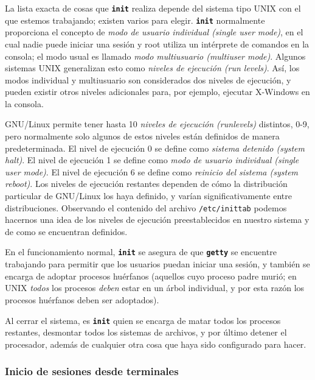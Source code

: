 \documentclass[12pt]{article}
\begin{document}
 La lista exacta de cosas que \texttt{\textbf{init}} realiza depende del sistema tipo UNIX
con el que estemos trabajando; existen varios para elegir. \texttt{\textbf{init}} normalmente
proporciona el concepto de \textit{modo de usuario individual (single user mode)}, en el cual nadie puede
iniciar una sesión y root utiliza un intérprete de comandos en la consola; el
modo usual es llamado \textit{modo multiusuario (multiuser mode)}.
Algunos sistemas UNIX generalizan esto
como \textit{niveles de ejecución (run levels)}. Así, los modos individual y
multiusuario son considerados dos niveles de ejecución, y pueden existir otros
niveles adicionales para, por ejemplo, ejecutar X-Windows en la consola.


 GNU/Linux permite tener hasta 10 \textit{niveles de ejecución (runlevels)} distintos, 0-9,
pero normalmente solo algunos de estos niveles están definidos de manera predeterminada. El
nivel de ejecución 0 se define como \textit{sistema detenido (system halt)}. El nivel
de ejecución 1 se define como \textit{modo de usuario individual (single user mode)}.
El nivel de ejecución 6 se define como \textit{reinicio del sistema (system reboot)}.
Los niveles de ejecución restantes dependen de cómo la distribución particular
de GNU/Linux los haya definido, y varían significativamente entre
distribuciones. Observando el contenido del archivo
\texttt{/etc/inittab} podemos hacernos una idea de los niveles de
ejecución preestablecidos en nuestro sistema y de como se encuentran definidos.


 En el funcionamiento normal, \texttt{\textbf{init}} se asegura de que
\texttt{\textbf{getty}} se encuentre trabajando para permitir que los usuarios puedan iniciar una
sesión, y también se encarga de adoptar procesos huérfanos (aquellos cuyo
proceso padre murió; en UNIX \textit{todos} los procesos \textit{deben} estar
en un árbol individual, y por esta razón los procesos huérfanos deben ser
adoptados).  

 Al cerrar el sistema, es \texttt{\textbf{init}} quien se encarga de
matar todos los procesos restantes, desmontar todos los sistemas de archivos, y
por último detener el procesador, además de cualquier otra cosa que haya sido
configurado para hacer.  



\subsubsection{Inicio de sesiones desde terminales}
\end{document}
